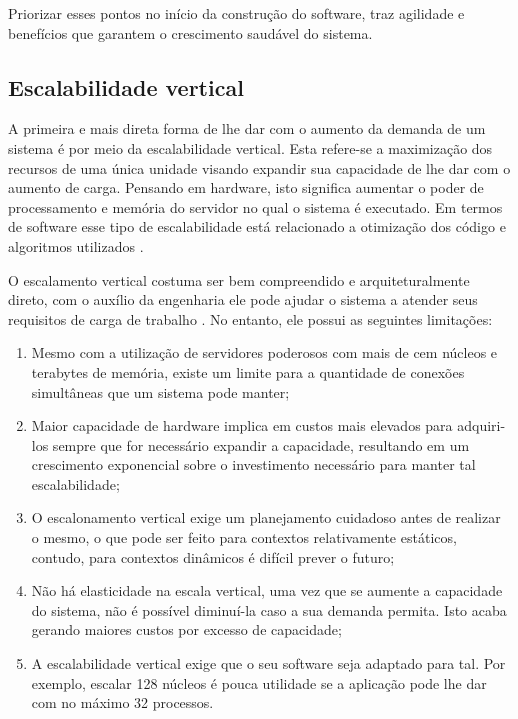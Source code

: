 Priorizar esses pontos no início da construção do software, traz agilidade e
benefícios que garantem o crescimento saudável do sistema.

\subsection{Escalabilidade vertical}

A primeira e mais direta forma de lhe dar com o aumento da demanda de um
sistema é por meio da escalabilidade vertical. Esta refere-se a maximização
dos recursos de uma única unidade visando expandir sua capacidade de lhe dar
com o aumento de carga.  Pensando em hardware, isto significa aumentar o poder
de processamento e memória do servidor no qual o sistema é executado. Em termos
de software esse tipo de escalabilidade está relacionado a otimização dos código
e algoritmos utilizados \cite{FreshGuide2012}.

O escalamento vertical costuma ser bem compreendido e arquiteturalmente direto,
com o auxílio da engenharia ele pode ajudar o sistema a atender seus requisitos
de carga de trabalho \cite{InterSystems2019}. No entanto, ele possui as seguintes
limitações:

\begin{enumerate}
    \item{Mesmo com a utilização de servidores poderosos com mais de cem núcleos
    e terabytes de memória, existe um limite para a quantidade de conexões
    simultâneas que um sistema pode manter;}
    \item{Maior capacidade de hardware implica em custos mais elevados para
    adquiri-los sempre que for necessário expandir a capacidade, resultando em
    um crescimento exponencial sobre o investimento necessário para manter tal
    escalabilidade;}
    \item{O escalonamento vertical exige um planejamento cuidadoso antes de
    realizar o mesmo, o que pode ser feito para contextos relativamente estáticos,
    contudo, para contextos dinâmicos é difícil prever o futuro;}
    \item{Não há elasticidade na escala vertical, uma vez que se aumente a
    capacidade do sistema, não é possível diminuí-la caso a sua demanda permita.
    Isto acaba gerando maiores custos por excesso de capacidade;}
    \item{A escalabilidade vertical exige que o seu software seja adaptado para
    tal. Por exemplo, escalar 128 núcleos é pouca utilidade se a aplicação pode
    lhe dar com no máximo 32 processos.}
\end{enumerate}

